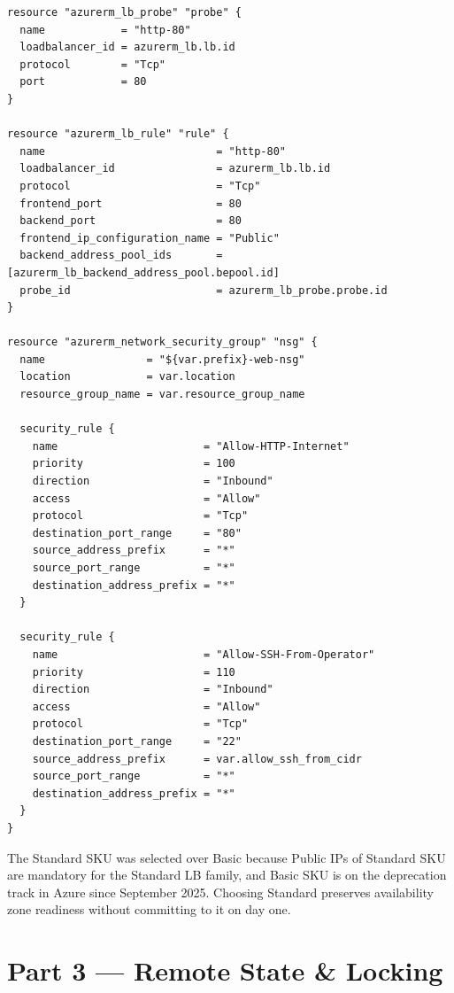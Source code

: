 \documentclass[10pt,a4paper,twocolumn]{article}
\begin{document}
\begin{lstlisting}[style=hclcode, caption={Standard LB, probe, rule and NSG (excerpt of \texttt{modules/lb/main.tf})}]
resource "azurerm_lb_probe" "probe" {
  name            = "http-80"
  loadbalancer_id = azurerm_lb.lb.id
  protocol        = "Tcp"
  port            = 80
}

resource "azurerm_lb_rule" "rule" {
  name                           = "http-80"
  loadbalancer_id                = azurerm_lb.lb.id
  protocol                       = "Tcp"
  frontend_port                  = 80
  backend_port                   = 80
  frontend_ip_configuration_name = "Public"
  backend_address_pool_ids       = [azurerm_lb_backend_address_pool.bepool.id]
  probe_id                       = azurerm_lb_probe.probe.id
}

resource "azurerm_network_security_group" "nsg" {
  name                = "${var.prefix}-web-nsg"
  location            = var.location
  resource_group_name = var.resource_group_name

  security_rule {
    name                       = "Allow-HTTP-Internet"
    priority                   = 100
    direction                  = "Inbound"
    access                     = "Allow"
    protocol                   = "Tcp"
    destination_port_range     = "80"
    source_address_prefix      = "*"
    source_port_range          = "*"
    destination_address_prefix = "*"
  }

  security_rule {
    name                       = "Allow-SSH-From-Operator"
    priority                   = 110
    direction                  = "Inbound"
    access                     = "Allow"
    protocol                   = "Tcp"
    destination_port_range     = "22"
    source_address_prefix      = var.allow_ssh_from_cidr
    source_port_range          = "*"
    destination_address_prefix = "*"
  }
}
\end{lstlisting}

\begin{note}
The Standard SKU was selected over Basic because Public IPs of Standard
SKU are mandatory for the Standard LB family, and Basic SKU is on the
deprecation track in Azure since September 2025. Choosing Standard
preserves availability zone readiness without committing to it on day
one.
\end{note}

\section{Part 3 --- Remote State \& Locking}
\end{document}
